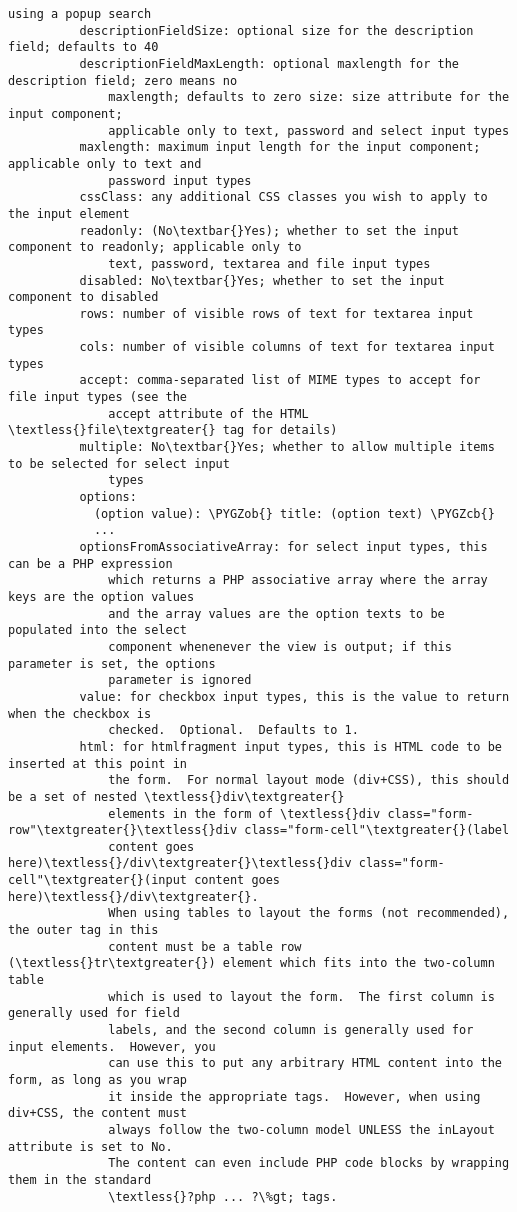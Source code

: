\documentclass[letterpaper,10pt,english]{sphinxmanual}
\def\PYGZob{\char`\{}
\def\PYGZcb{\char`\}}
\begin{document}
\begin{Verbatim}[commandchars=\\\{\}]
              using a popup search
          descriptionFieldSize: optional size for the description field; defaults to 40
          descriptionFieldMaxLength: optional maxlength for the description field; zero means no
              maxlength; defaults to zero size: size attribute for the input component;
              applicable only to text, password and select input types
          maxlength: maximum input length for the input component; applicable only to text and
              password input types
          cssClass: any additional CSS classes you wish to apply to the input element
          readonly: (No\textbar{}Yes); whether to set the input component to readonly; applicable only to
              text, password, textarea and file input types
          disabled: No\textbar{}Yes; whether to set the input component to disabled
          rows: number of visible rows of text for textarea input types
          cols: number of visible columns of text for textarea input types
          accept: comma-separated list of MIME types to accept for file input types (see the
              accept attribute of the HTML \textless{}file\textgreater{} tag for details)
          multiple: No\textbar{}Yes; whether to allow multiple items to be selected for select input
              types
          options:
            (option value): \PYGZob{} title: (option text) \PYGZcb{}
            ...
          optionsFromAssociativeArray: for select input types, this can be a PHP expression
              which returns a PHP associative array where the array keys are the option values
              and the array values are the option texts to be populated into the select
              component whenenever the view is output; if this parameter is set, the options
              parameter is ignored
          value: for checkbox input types, this is the value to return when the checkbox is
              checked.  Optional.  Defaults to 1.
          html: for htmlfragment input types, this is HTML code to be inserted at this point in
              the form.  For normal layout mode (div+CSS), this should be a set of nested \textless{}div\textgreater{}
              elements in the form of \textless{}div class="form-row"\textgreater{}\textless{}div class="form-cell"\textgreater{}(label
              content goes here)\textless{}/div\textgreater{}\textless{}div class="form-cell"\textgreater{}(input content goes here)\textless{}/div\textgreater{}.
              When using tables to layout the forms (not recommended), the outer tag in this
              content must be a table row (\textless{}tr\textgreater{}) element which fits into the two-column table
              which is used to layout the form.  The first column is generally used for field
              labels, and the second column is generally used for input elements.  However, you
              can use this to put any arbitrary HTML content into the form, as long as you wrap
              it inside the appropriate tags.  However, when using div+CSS, the content must
              always follow the two-column model UNLESS the inLayout attribute is set to No.
              The content can even include PHP code blocks by wrapping them in the standard
              \textless{}?php ... ?\%gt; tags.


\end{Verbatim}
\end{document}
